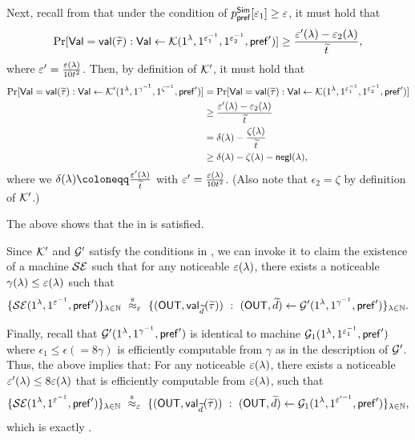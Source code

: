 Next, recall from  that under the condition of $p_\mathsf{pref}^{\mathsf{Sim}}[\varepsilon_1] \ge \varepsilon$, it must hold that 
$$\Pr[\mathsf{Val} = \mathsf{val}(\widetilde{\tau}) : \mathsf{Val} \gets \mathcal{K}{(1^\lambda, 1^{\varepsilon_1^{-1}},1^{\varepsilon_2^{-1}}, \mathsf{pref}')}] \ge {\frac{\varepsilon'(\lambda)-\varepsilon_2(\lambda)}{\widetilde{t}}},$$
where  $\varepsilon' = \frac{\varepsilon(\lambda)}{10t^2}$. Then, by definition of $\mathcal{K}'$, it must hold that 
\begin{align*}
\Pr[\mathsf{Val} = \mathsf{val}(\widetilde{\tau}) : \mathsf{Val} \gets \mathcal{K}'{(1^\lambda, 1^{\gamma^{-1}},1^{\zeta^{-1}}, \mathsf{pref}')}] &= \Pr[\mathsf{Val} = \mathsf{val}(\widetilde{\tau}) : \mathsf{Val} \gets \mathcal{K}{(1^\lambda, 1^{\varepsilon_1^{-1}},1^{\varepsilon_2^{-1}}, \mathsf{pref}')}] \\ 
&\ge 
{\frac{\varepsilon'(\lambda)-\varepsilon_2(\lambda)}{\widetilde{t}}}\\
& =
\delta(\lambda) - \frac{\zeta(\lambda)}{\widetilde{t}}  \\ 
& \ge 
\delta(\lambda) - \zeta(\lambda) -\mathsf{negl}(\lambda),
\end{align*}
where we $\delta(\secpar) \coloneqq \frac{\epsilon'(\secpar)}{\tilde{t}}$ with $\varepsilon' = \frac{\varepsilon(\lambda)}{10t^2}$. (Also note that $\epsilon_2 = \zeta$ by definition of $\mathcal{K}'$.)

The above shows that the  in  is satisfied.

 Since $\mathcal{K}'$ and $\mathcal{G}'$ satisfy the conditions in , we can invoke it to claim the existence of a machine $\mathcal{SE}$ such that
 for any noticeable $\varepsilon(\lambda)$, there exists a noticeable $\gamma(\lambda) \le \varepsilon(\lambda)$ such that
$$\{\mathcal{SE}(1^\lambda,1^{\varepsilon^{-1}},\mathsf{pref}')\}_{\lambda \in \mathbb{N}}
~\stackrel{\text{s}}{\approx}_{\varepsilon}~ 
\{(\mathsf{OUT}, \mathsf{val}_{\widetilde{d}}(\widetilde{\tau}))~:~(\mathsf{OUT},  \widetilde{d})\leftarrow \mathcal{G}'(1^\lambda,1^{\gamma^{-1}},\mathsf{pref}')\}_{\lambda \in \mathbb{N}}.$$

Finally, recall that $\mathcal{G}'(1^\lambda,1^{\gamma^{-1}},\mathsf{pref}')$ is identical to machine $\mathcal{G}_1(1^\lambda,1^{\varepsilon_1^{-1}},\mathsf{pref}')$ where $\epsilon_1 \le \epsilon (=8\gamma)$ is efficiently computable from $\gamma$ as in the description of $\mathcal{G}'$. Thus, the above implies that: 
For any noticeable $\varepsilon(\lambda)$, there exists a noticeable $\varepsilon'(\lambda) \le 8 \varepsilon(\lambda)$ that is efficiently computable from $\varepsilon(\lambda)$, such that
$$\{\mathcal{SE}(1^\lambda,1^{\varepsilon^{-1}},\mathsf{pref}')\}_{\lambda \in \mathbb{N}}
~\stackrel{\text{s}}{\approx}_{\varepsilon}~ 
\{(\mathsf{OUT}, \mathsf{val}_{\widetilde{d}}(\widetilde{\tau}))~:~(\mathsf{OUT}, \widetilde{d})\leftarrow \mathcal{G}_1(1^\lambda,1^{\varepsilon'^{-1}},\mathsf{pref}')\}_{\lambda \in \mathbb{N}},$$
which is exactly .
